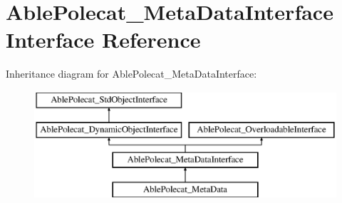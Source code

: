 \hypertarget{interface_able_polecat___meta_data_interface}{}\section{Able\+Polecat\+\_\+\+Meta\+Data\+Interface Interface Reference}
\label{interface_able_polecat___meta_data_interface}
Inheritance diagram for Able\+Polecat\+\_\+\+Meta\+Data\+Interface\+:\begin{figure}[H]
\begin{center}
\leavevmode
\includegraphics[height=4.000000cm]{interface_able_polecat___meta_data_interface}
\end{center}
\end{figure}
